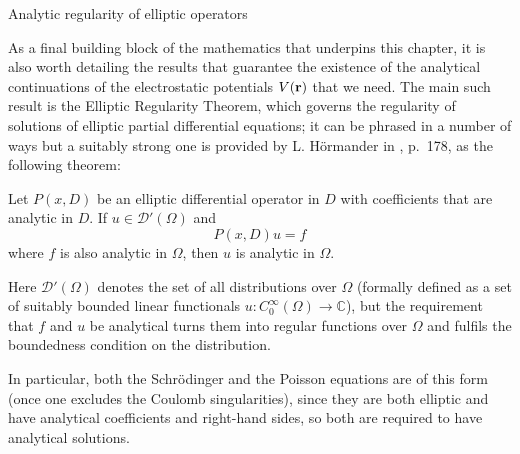\begin{mathaside}{Analytic regularity of elliptic operators}
\label{aside.elliptic-regularity}

As a final building block of the mathematics that underpins this chapter, it is also worth detailing the results that guarantee the existence of the analytical continuations of the electrostatic potentials $V(\vb{r})$ that we need. The main such result is the Elliptic Regularity Theorem, which governs the regularity of solutions of elliptic partial differential equations; it can be phrased in a number of ways but a suitably strong one is provided by L. Hörmander in , p.~178, as the following theorem:

\begin{theorem}
Let $P(x, D)$ be an elliptic differential operator in $D$ with coefficients that are analytic in $D$. If $u\in \mathscr D'(\Omega)$ and 
\begin{equation}
P(x, D)u = f 
\end{equation}
where $f$ is also analytic in $\Omega$, then $u$ is analytic in $\Omega$. 
\end{theorem}


Here $\mathscr D'(\Omega)$ denotes the set of all distributions over $\Omega$ (formally defined as a set of suitably bounded linear functionals $u\colon C_0^\infty(\Omega) \to \mathbb{C}$), but the requirement that $f$ and $u$ be analytical turns them into regular functions over $\Omega$ and fulfils the boundedness condition on the distribution. %

%

\vspace{\maskip}
In particular, both the Schrödinger and the Poisson equations are of this form (once one excludes the Coulomb singularities), since they are both elliptic and have analytical coefficients and right-hand sides, so both are required to have analytical solutions.

\end{mathaside}




